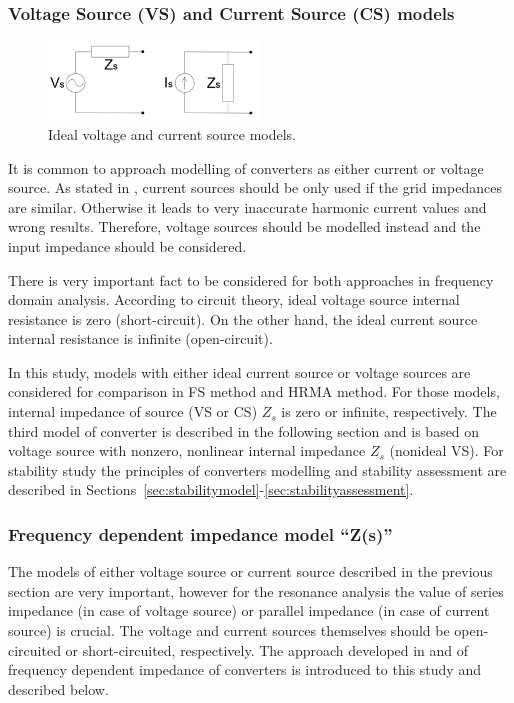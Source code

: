 \documentclass[12pt]{report} %
\begin{document}
\subsubsection{Voltage Source  (VS) and Current Source (CS) models} 		\label{sec:powerconverters-vscs}

\begin{figure}[htb]
	\centering
    	\includegraphics[width=0.5\textwidth]{img/theory/vscsmodels.png}
  	\caption{Ideal voltage and current source models.}
  	\label{fig:vscsmodels}
\end{figure}
\FloatBarrier

It is common to approach modelling of converters as either current or voltage source. As stated in \cite{borwin1}, current sources should be only used if the grid impedances are similar. Otherwise it leads to very inaccurate harmonic current values and wrong results. Therefore, voltage sources should be modelled instead and the input impedance should be considered.

There is very important fact to be considered for both approaches in frequency domain analysis. According to circuit theory, ideal voltage source internal resistance is zero (short-circuit). On the other hand, the ideal current source internal resistance is infinite (open-circuit).

In this study, models with either ideal current source or voltage sources are considered for comparison in FS method and HRMA method. For those models, internal impedance of source (VS or CS) $Z_s$ is zero or infinite, respectively. The third model of converter is described in the following section and is based on voltage source with nonzero, nonlinear internal impedance $Z_s$ (nonideal VS). For stability study the principles of converters modelling and stability assessment are described in Sections~\ref{sec:stabilitymodel}-\ref{sec:stabilityassessment}.

\subsubsection{Frequency dependent impedance model “Z(s)”}  \label{sec:powerconverters-zs}

The models of either voltage source or current source described in the previous section are very important, however for the resonance analysis the value of series impedance (in case of voltage source) or parallel impedance (in case of current source) is crucial. The voltage and current sources themselves should be open-circuited or short-circuited, respectively. The approach developed in \cite{liusun2014} and \cite{liusun2013} of frequency dependent impedance of converters is introduced to this study and described below.
\end{document}
